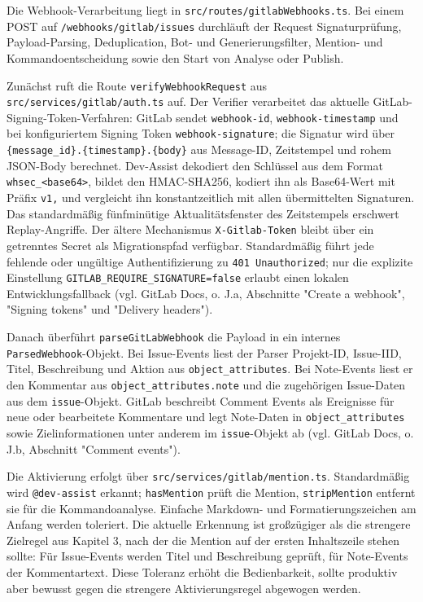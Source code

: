\documentclass[12pt,a4paper,oneside]{scrreprt}
\begin{document}
Die Webhook-Verarbeitung liegt in \texttt{src/routes/gitlabWebhooks.ts}. Bei einem POST auf \texttt{/webhooks/gitlab/issues} durchläuft der Request Signaturprüfung, Payload-Parsing, Deduplication, Bot- und Generierungsfilter, Mention- und Kommandoentscheidung sowie den Start von Analyse oder Publish.

Zunächst ruft die Route \texttt{verifyWebhookRequest} aus \texttt{src/services/gitlab/auth.ts} auf. Der Verifier verarbeitet das aktuelle GitLab-Signing-Token-Verfahren: GitLab sendet \texttt{webhook-id}, \texttt{webhook-timestamp} und bei konfiguriertem Signing Token \texttt{webhook-signature}; die Signatur wird über \texttt{\{message\_id\}.\{timestamp\}.\{body\}} aus Message-ID, Zeitstempel und rohem JSON-Body berechnet. Dev-Assist dekodiert den Schlüssel aus dem Format \texttt{whsec\_\textless{}base64\textgreater{}}, bildet den HMAC-SHA256, kodiert ihn als Base64-Wert mit Präfix \texttt{v1,} und vergleicht ihn konstantzeitlich mit allen übermittelten Signaturen. Das standardmäßig fünfminütige Aktualitätsfenster des Zeitstempels erschwert Replay-Angriffe. Der ältere Mechanismus \texttt{X-Gitlab-Token} bleibt über ein getrenntes Secret als Migrationspfad verfügbar. Standardmäßig führt jede fehlende oder ungültige Authentifizierung zu \texttt{401 Unauthorized}; nur die explizite Einstellung \texttt{GITLAB\_REQUIRE\_SIGNATURE=false} erlaubt einen lokalen Entwicklungsfallback (vgl. GitLab Docs, o. J.a, Abschnitte "Create a webhook", "Signing tokens" und "Delivery headers").

Danach überführt \texttt{parseGitLabWebhook} die Payload in ein internes \texttt{ParsedWebhook}-Objekt. Bei Issue-Events liest der Parser Projekt-ID, Issue-IID, Titel, Beschreibung und Aktion aus \texttt{object\_attributes}. Bei Note-Events liest er den Kommentar aus \texttt{object\_attributes.note} und die zugehörigen Issue-Daten aus dem \texttt{issue}-Objekt. GitLab beschreibt Comment Events als Ereignisse für neue oder bearbeitete Kommentare und legt Note-Daten in \texttt{object\_attributes} sowie Zielinformationen unter anderem im \texttt{issue}-Objekt ab (vgl. GitLab Docs, o. J.b, Abschnitt "Comment events").

Die Aktivierung erfolgt über \texttt{src/services/gitlab/mention.ts}. Standardmäßig wird \texttt{@dev-assist} erkannt; \texttt{hasMention} prüft die Mention, \texttt{stripMention} entfernt sie für die Kommandoanalyse. Einfache Markdown- und Formatierungszeichen am Anfang werden toleriert. Die aktuelle Erkennung ist großzügiger als die strengere Zielregel aus Kapitel 3, nach der die Mention auf der ersten Inhaltszeile stehen sollte: Für Issue-Events werden Titel und Beschreibung geprüft, für Note-Events der Kommentartext. Diese Toleranz erhöht die Bedienbarkeit, sollte produktiv aber bewusst gegen die strengere Aktivierungsregel abgewogen werden.
\end{document}
